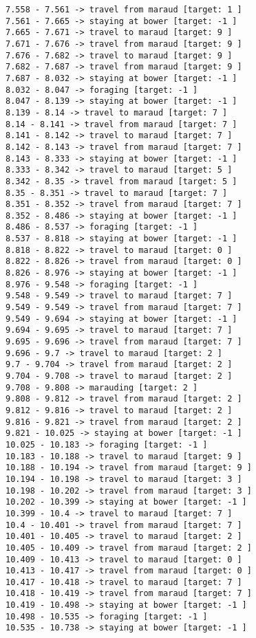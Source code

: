 \documentclass[11pt]{article}
\begin{document}
\begin{Verbatim}[commandchars=\\\{\}]
7.558 - 7.561 -> travel from maraud [target: 1 ]
7.561 - 7.665 -> staying at bower [target: -1 ]
7.665 - 7.671 -> travel to maraud [target: 9 ]
7.671 - 7.676 -> travel from maraud [target: 9 ]
7.676 - 7.682 -> travel to maraud [target: 9 ]
7.682 - 7.687 -> travel from maraud [target: 9 ]
7.687 - 8.032 -> staying at bower [target: -1 ]
8.032 - 8.047 -> foraging [target: -1 ]
8.047 - 8.139 -> staying at bower [target: -1 ]
8.139 - 8.14 -> travel to maraud [target: 7 ]
8.14 - 8.141 -> travel from maraud [target: 7 ]
8.141 - 8.142 -> travel to maraud [target: 7 ]
8.142 - 8.143 -> travel from maraud [target: 7 ]
8.143 - 8.333 -> staying at bower [target: -1 ]
8.333 - 8.342 -> travel to maraud [target: 5 ]
8.342 - 8.35 -> travel from maraud [target: 5 ]
8.35 - 8.351 -> travel to maraud [target: 7 ]
8.351 - 8.352 -> travel from maraud [target: 7 ]
8.352 - 8.486 -> staying at bower [target: -1 ]
8.486 - 8.537 -> foraging [target: -1 ]
8.537 - 8.818 -> staying at bower [target: -1 ]
8.818 - 8.822 -> travel to maraud [target: 0 ]
8.822 - 8.826 -> travel from maraud [target: 0 ]
8.826 - 8.976 -> staying at bower [target: -1 ]
8.976 - 9.548 -> foraging [target: -1 ]
9.548 - 9.549 -> travel to maraud [target: 7 ]
9.549 - 9.549 -> travel from maraud [target: 7 ]
9.549 - 9.694 -> staying at bower [target: -1 ]
9.694 - 9.695 -> travel to maraud [target: 7 ]
9.695 - 9.696 -> travel from maraud [target: 7 ]
9.696 - 9.7 -> travel to maraud [target: 2 ]
9.7 - 9.704 -> travel from maraud [target: 2 ]
9.704 - 9.708 -> travel to maraud [target: 2 ]
9.708 - 9.808 -> marauding [target: 2 ]
9.808 - 9.812 -> travel from maraud [target: 2 ]
9.812 - 9.816 -> travel to maraud [target: 2 ]
9.816 - 9.821 -> travel from maraud [target: 2 ]
9.821 - 10.025 -> staying at bower [target: -1 ]
10.025 - 10.183 -> foraging [target: -1 ]
10.183 - 10.188 -> travel to maraud [target: 9 ]
10.188 - 10.194 -> travel from maraud [target: 9 ]
10.194 - 10.198 -> travel to maraud [target: 3 ]
10.198 - 10.202 -> travel from maraud [target: 3 ]
10.202 - 10.399 -> staying at bower [target: -1 ]
10.399 - 10.4 -> travel to maraud [target: 7 ]
10.4 - 10.401 -> travel from maraud [target: 7 ]
10.401 - 10.405 -> travel to maraud [target: 2 ]
10.405 - 10.409 -> travel from maraud [target: 2 ]
10.409 - 10.413 -> travel to maraud [target: 0 ]
10.413 - 10.417 -> travel from maraud [target: 0 ]
10.417 - 10.418 -> travel to maraud [target: 7 ]
10.418 - 10.419 -> travel from maraud [target: 7 ]
10.419 - 10.498 -> staying at bower [target: -1 ]
10.498 - 10.535 -> foraging [target: -1 ]
10.535 - 10.738 -> staying at bower [target: -1 ]

\end{Verbatim}
\end{document}
